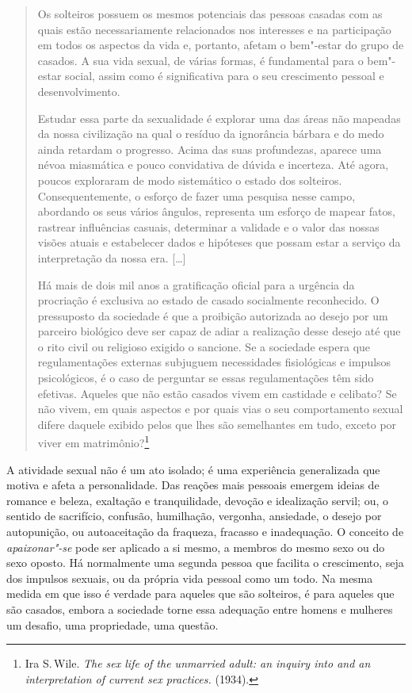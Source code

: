 \begin{quote}
Os solteiros possuem os mesmos potenciais das pessoas casadas com as
quais estão necessariamente relacionados nos interesses e na
participação em todos os aspectos da vida e, portanto, afetam o
bem"-estar do grupo de casados. A sua vida sexual, de várias formas, é
fundamental para o bem"-estar social, assim como é significativa para o
seu crescimento pessoal e desenvolvimento.

Estudar essa parte da sexualidade é explorar uma das áreas não
mapeadas da nossa civilização na qual o resíduo da ignorância bárbara e
do medo ainda retardam o progresso. Acima das suas profundezas, aparece
uma névoa miasmática e pouco convidativa de dúvida e incerteza. Até
agora, poucos exploraram de modo sistemático o estado dos solteiros.
Consequentemente, o esforço de fazer uma pesquisa nesse campo, abordando
os seus vários ângulos, representa um esforço de mapear fatos, rastrear
influências casuais, determinar a validade e o valor das nossas visões
atuais e estabelecer dados e hipóteses que possam estar a serviço
da interpretação da nossa era. {[}\ldots{}{]}

Há mais de dois mil anos a gratificação oficial para a urgência da procriação
é exclusiva ao estado de casado socialmente reconhecido. O
pressuposto da sociedade é que a proibição autorizada ao desejo por um
parceiro biológico deve ser capaz de adiar a realização desse desejo até que o
rito civil ou religioso exigido o sancione. Se a sociedade espera
que regulamentações externas subjuguem necessidades fisiológicas e
impulsos psicológicos, é o caso de perguntar se essas regulamentações têm
sido efetivas. Aqueles que não estão casados vivem em castidade e
celibato? Se não vivem, em quais aspectos e por quais vias o seu comportamento sexual
difere daquele exibido pelos que lhes são semelhantes em tudo,
exceto por viver em matrimônio?\footnote{Ira S.\,Wile. \textit{The sex
  life of the unmarried adult: an inquiry into and an interpretation of
  current sex practices.} (1934).}
  \end{quote}

A atividade sexual não é um ato isolado; é uma experiência generalizada
que motiva e afeta a personalidade. Das reações mais pessoais
emergem ideias de romance e beleza, exaltação e tranquilidade, devoção e
idealização servil; ou, o sentido de sacrifício, confusão, humilhação,
vergonha, ansiedade, o desejo por autopunição, ou autoaceitação da
fraqueza, fracasso e inadequação. O conceito de \textit{apaixonar"-se} pode
ser aplicado a si mesmo, a membros do mesmo sexo ou do sexo oposto. Há
normalmente uma segunda pessoa que facilita o crescimento, seja dos
impulsos sexuais, ou da própria vida pessoal como um todo. Na mesma
medida em que isso é verdade para aqueles que são solteiros, é para
aqueles que são casados, embora a sociedade torne essa adequação entre homens e mulheres um
desafio, uma propriedade, uma questão.

